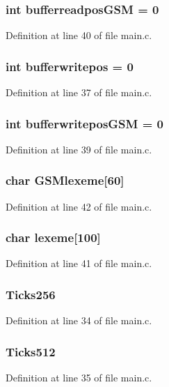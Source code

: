 \subsubsection{\setlength{\rightskip}{0pt plus 5cm}int {\bf bufferreadposGSM} = 0}\label{main_8c_1ce374fcc63c0fd7f964ac7e0e740a9e}




Definition at line 40 of file main.c.
\subsubsection{\setlength{\rightskip}{0pt plus 5cm}int {\bf bufferwritepos} = 0}\label{main_8c_0f892a693b70cf63556b0b44ebe8571f}




Definition at line 37 of file main.c.
\subsubsection{\setlength{\rightskip}{0pt plus 5cm}int {\bf bufferwriteposGSM} = 0}\label{main_8c_66579f64c30bad8749df40ed470473e4}




Definition at line 39 of file main.c.
\subsubsection{\setlength{\rightskip}{0pt plus 5cm}char {\bf GSMlexeme}[60]}\label{main_8c_d40004cec7ab365b58ef7a7edb13ac40}




Definition at line 42 of file main.c.
\subsubsection{\setlength{\rightskip}{0pt plus 5cm}char {\bf lexeme}[100]}\label{main_8c_664c3894da354bfe74668c52840de2b2}




Definition at line 41 of file main.c.
\subsubsection{ {\bf Ticks256}}\label{main_8c_cbc2ab6270ec288f8fec8ae61922673a}




Definition at line 34 of file main.c.
\subsubsection{ {\bf Ticks512}}\label{main_8c_1f643c7b3a5357df969587d48abe43f6}




Definition at line 35 of file main.c.